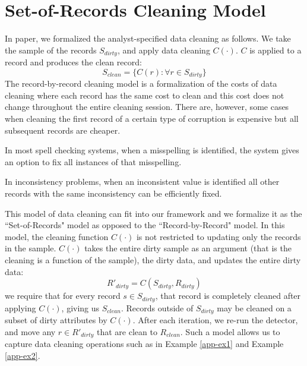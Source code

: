 \section{Set-of-Records Cleaning Model}\label{set-of-r}
In paper, we formalized the analyst-specified data cleaning as follows.
We take the sample of the records $S_{dirty}$, and apply data cleaning $C(\cdot)$.
$C$ is applied to a record and produces the clean record:
\[
S_{clean} = \{C(r) : \forall r \in S_{dirty}\}
\]
The record-by-record cleaning model is a formalization of the costs of data cleaning where each record has the same cost to clean and this cost does not change throughout the entire cleaning session.
There are, however, some cases when cleaning the first record of a certain type of corruption is expensive but all subsequent records are cheaper.

\begin{example}\label{app-ex1}
In most spell checking systems, when a misspelling is identified, the system gives an option to fix all instances of that misspelling.
\end{example}

\begin{example}\label{app-ex2}
In inconsistency problems, when an inconsistent value is identified all other records with the same inconsistency can be efficiently fixed.
\end{example}

This model of data cleaning can fit into our framework and we formalize it as the ``Set-of-Records" model as opposed to the ``Record-by-Record" model. 
In this model, the cleaning function $C(\cdot)$ is not restricted to updating only the records in the sample.
$C(\cdot)$ takes the entire dirty sample as an argument (that is the cleaning is a function of the sample), the dirty data, and updates the entire dirty data:
\[
R'_{dirty} = C(S_{dirty},R_{dirty})
\]
we require that for every record $s \in S_{dirty}$, that record is completely cleaned after applying $C(\cdot)$, giving us $S_{clean}$.
Records outside of $S_{dirty}$ may be cleaned on a subset of dirty attributes by $C(\cdot)$.
After each iteration, we re-run the detector, and move any $r \in R'_{dirty}$ that are clean to $R_{clean}$.
Such a model allows us to capture data cleaning operations such as in Example \ref{app-ex1} and Example \ref{app-ex2}.

